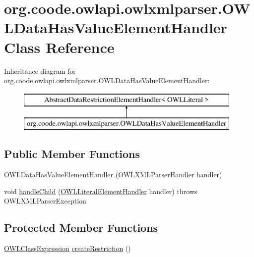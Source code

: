 \hypertarget{classorg_1_1coode_1_1owlapi_1_1owlxmlparser_1_1_o_w_l_data_has_value_element_handler}{\section{org.\-coode.\-owlapi.\-owlxmlparser.\-O\-W\-L\-Data\-Has\-Value\-Element\-Handler Class Reference}
\label{classorg_1_1coode_1_1owlapi_1_1owlxmlparser_1_1_o_w_l_data_has_value_element_handler}
}
Inheritance diagram for org.\-coode.\-owlapi.\-owlxmlparser.\-O\-W\-L\-Data\-Has\-Value\-Element\-Handler\-:\begin{figure}[H]
\begin{center}
\leavevmode
\includegraphics[height=2.000000cm]{classorg_1_1coode_1_1owlapi_1_1owlxmlparser_1_1_o_w_l_data_has_value_element_handler}
\end{center}
\end{figure}
\subsection*{Public Member Functions}
\begin{DoxyCompactItemize}
\item 
\hyperlink{classorg_1_1coode_1_1owlapi_1_1owlxmlparser_1_1_o_w_l_data_has_value_element_handler_aa2d1e1f3ba52af39ebd898f4a312f487}{O\-W\-L\-Data\-Has\-Value\-Element\-Handler} (\hyperlink{classorg_1_1coode_1_1owlapi_1_1owlxmlparser_1_1_o_w_l_x_m_l_parser_handler}{O\-W\-L\-X\-M\-L\-Parser\-Handler} handler)
\item 
void \hyperlink{classorg_1_1coode_1_1owlapi_1_1owlxmlparser_1_1_o_w_l_data_has_value_element_handler_aa371148741d2d3b5aeb08f52ac3f7fad}{handle\-Child} (\hyperlink{classorg_1_1coode_1_1owlapi_1_1owlxmlparser_1_1_o_w_l_literal_element_handler}{O\-W\-L\-Literal\-Element\-Handler} handler)  throws O\-W\-L\-X\-M\-L\-Parser\-Exception 
\end{DoxyCompactItemize}
\subsection*{Protected Member Functions}
\begin{DoxyCompactItemize}
\item 
\hyperlink{interfaceorg_1_1semanticweb_1_1owlapi_1_1model_1_1_o_w_l_class_expression}{O\-W\-L\-Class\-Expression} \hyperlink{classorg_1_1coode_1_1owlapi_1_1owlxmlparser_1_1_o_w_l_data_has_value_element_handler_adca0ef6d21e35f50646cae2628385184}{create\-Restriction} ()
\end{DoxyCompactItemize}



